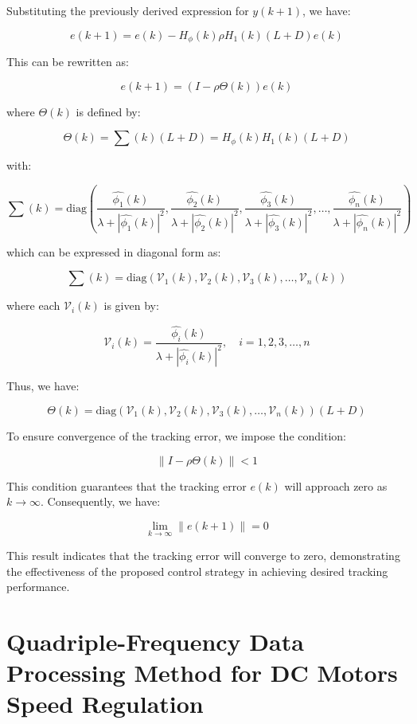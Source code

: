 \documentclass[journal,onecolumn]{IEEEtran}
\begin{document}
Substituting the previously derived expression for \(y(k+1)\), we have:

\[
e(k+1) = e(k) - H_\phi(k) \rho H_1(k) (L + D) e(k)
\]

This can be rewritten as:

\begin{equation}
    \label{model 35}
    e(k+1) = (I - \rho \Theta(k)) e(k)
\end{equation}

where \(\Theta(k)\) is defined by:

\[
\Theta(k) = \sum(k) (L + D) = H_\phi(k) H_1(k) (L + D)
\]

with:

\[
\sum(k) = \text{diag}\left(\frac{\hat{\phi_1}(k)}{\lambda + |\hat{\phi_1}(k)|^2}, \frac{\hat{\phi_2}(k)}{\lambda + |\hat{\phi_2}(k)|^2}, \frac{\hat{\phi_3}(k)}{\lambda + |\hat{\phi_3}(k)|^2}, \dots, \frac{\hat{\phi_n}(k)}{\lambda + |\hat{\phi_n}(k)|^2}\right)
\]

which can be expressed in diagonal form as:

\[
\sum(k) = \text{diag}(\mathcal{V}_1(k), \mathcal{V}_2(k), \mathcal{V}_3(k), \dots, \mathcal{V}_n(k))
\]

where each \(\mathcal{V}_i(k)\) is given by:

\[
\mathcal{V}_i(k) = \frac{\hat{\phi_i}(k)}{\lambda + |\hat{\phi_i}(k)|^2}, \quad i = 1, 2, 3, \dots, n
\]

Thus, we have:

\[
\Theta(k) = \text{diag}(\mathcal{V}_1(k), \mathcal{V}_2(k), \mathcal{V}_3(k), \dots, \mathcal{V}_n(k)) (L + D)
\]

To ensure convergence of the tracking error, we impose the condition:

\begin{equation}
    \label{model 36}
    \|I - \rho \Theta(k)\| < 1
\end{equation}

This condition guarantees that the tracking error \(e(k)\) will approach zero as \(k \to \infty\). Consequently, we have:

\[
\lim_{k \to \infty} \|e(k+1)\| = 0
\]

This result indicates that the tracking error will converge to zero, demonstrating the effectiveness of the proposed control strategy in achieving desired tracking performance.

\section{Quadriple-Frequency Data Processing Method for DC Motors Speed Regulation}
\end{document}
